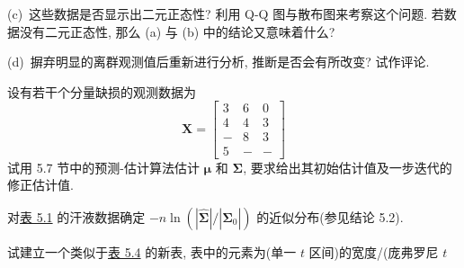(c)\ 这些数据是否显示出二元正态性? 利用 Q-Q 图与散布图来考察这个问题. 若数据没有二元正态性, 那么 (a) 与 (b) 中的结论又意味着什么?

(d)\ 摒弃明显的离群观测值后重新进行分析, 推断是否会有所改变? 试作评论.

\quad 设有若干个分量缺损的观测数据为
\[
\mathbf{X}=\begin{bmatrix}
3&6&0\\
4&4&3\\
-&8&3\\
5&-&-
\end{bmatrix}
\]
试用 5.7 节中的预测-估计算法估计 $\boldsymbol{\mu}$ 和 $\boldsymbol{\Sigma}$, 要求给出其初始估计值及一步迭代的修正估计值.

\quad 对\hyperref[tab:5.1]{表 5.1} 的汗液数据确定 $-n\ln(|\hat{\boldsymbol{\Sigma}}|/|\hat{\boldsymbol{\Sigma}}_0|)$ 的近似分布(参见结论 5.2).

\quad 试建立一个类似于\hyperref[tab:5.4]{表 5.4} 的新表, 表中的元素为(单一 $t$ 区间)的宽度/(庞弗罗尼 $t$

